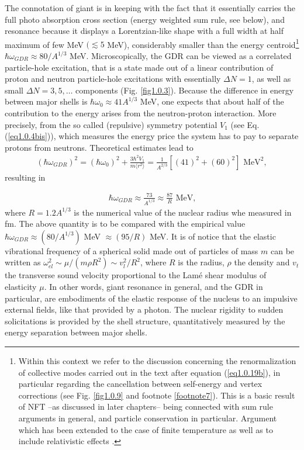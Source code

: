 \documentclass[a4paper,11pt]{book}
\numberwithin{equation}{section}
\numberwithin{figure}{section}
\numberwithin{table}{section}
\newcommand{\braket}[1]{\langle {#1} \rangle }
\begin{document}
The connotation of giant is in keeping with the fact that it essentially carries the full photo absorption cross section (energy weighted sum rule, see below), and resonance because it displays a Lorentzian-like shape with a full width at half maximum of few MeV $(\lesssim5$ MeV), considerably  smaller than the energy centroid\footnote{Within this context we refer to the discussion concerning the renormalization of collective modes carried out in the text after equation (\ref{eq1.0.19b}), in particular regarding the cancellation between self-energy and vertex corrections (see Fig. \ref{fig1.0.9} and footnote \ref{footnote7}). This is a basic result of NFT --as discussed in later chapters-- being connected with sum rule arguments in general, and particle conservation in particular. Argument which has been extended to the case of finite temperature as well as to include relativistic effects \cite{Nambu:60,Ward:50,Bortignon:81,Bertsch:83,Bortignon:98,Litvinova:18,Wibowo:19}.} $\hbar\omega_{GDR}\approx80/A^{1/3}$ MeV. Microscopically, the GDR can be viewed as a correlated particle-hole excitation, that is a state made out of a linear contribution of proton and neutron particle-hole excitations with essentially $\Delta N=1$, as well as small $\Delta N=3,5,\dots$ components (Fig. \ref{fig1.0.3}). Because the difference in energy between major shells is $\hbar\omega_0\approx41A^{1/3}$ MeV, one expects that about half of the contribution to the energy arises from the neutron-proton interaction. More precisely, from the so called (repulsive) symmetry potential $V_1$ (see Eq.  (\ref{eq1.0.4bis})), which measures the energy price the system has to pay to separate protons from neutrons. Theoretical estimates lead to 
\begin{align}\label{eq0.1.106}
(\hbar\omega_{GDR})^2=(\hbar\omega_0)^2+\frac{3\hbar^2V_1}{m\braket{r^2}}=\frac{1}{A^{2/3}}\left[(41)^2+(60)^2\right]\text{ MeV}^2,
\end{align}
resulting in

\begin{align}\label{eq0.1.107}
\hbar\omega_{GDR}\approx\frac{73}{A^{1/3}}\approx\frac{87}{R}\text{ MeV,}
\end{align}
where $R=1.2A^{1/3}$ is the numerical value of the nuclear radius whe measured in fm. The above quantity is to be compared with the empirical value $\hbar\omega_{GDR}\approx(80/A^{1/3})$ MeV $\approx(95/R)$ MeV.
It is of notice that the elastic vibrational frequency of a spherical solid made out of particles of mass $m$ can be written as $\omega_{el}^2\sim\mu/(m\rho R^2)\sim v_l^2/R^2$, where $R$ is the radius, $\rho$ the density and $v_t$ the transverse sound velocity proportional to the Lam\'e shear modulus of elasticity $\mu$.
In other words, giant resonance in general, and the GDR in particular, are embodiments of the elastic response of the nucleus to an impulsive external fields, like that provided by a photon. The nuclear rigidity to sudden solicitations is provided by the shell structure, quantitatively measured by the energy separation between major shells.
\end{document}

